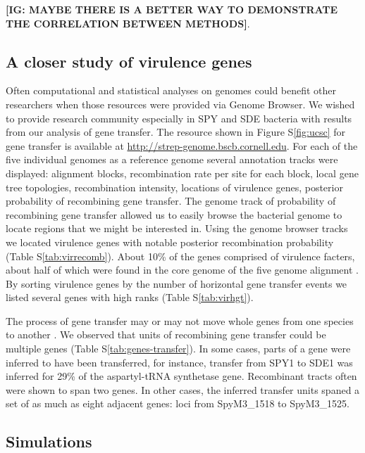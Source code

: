 \documentclass[10pt]{article}
\let\citep\cite
\begin{document}
{\bf [IG: MAYBE THERE IS A BETTER WAY TO DEMONSTRATE THE CORRELATION BETWEEN METHODS]}.

\subsection*{A closer study of virulence genes}

Often computational and statistical analyses on genomes could benefit other
researchers when those resources were provided via Genome Browser.  We wished to
provide research community especially in SPY and SDE bacteria with results from
our analysis of gene transfer.  The resource shown in Figure S\ref{fig:ucsc} for
gene transfer is available at \url{http://strep-genome.bscb.cornell.edu}.  For
each of the five individual genomes as a reference genome several annotation
tracks were displayed: alignment blocks, recombination rate per site for each
block, local gene tree topologies, recombination intensity, locations of
virulence genes, posterior probability of recombining gene transfer. The genome
track of probability of recombining gene transfer allowed us to easily browse
the bacterial genome to locate regions that we might be interested in.  Using
the genome browser tracks we located virulence genes with notable posterior
recombination probability (Table S\ref{tab:virrecomb}).  About 10\% of the genes
comprised of virulence facters, about half of which were found in the core
genome of the five genome alignment \citep{Suzuki2011}.  By sorting virulence
genes by the number of horizontal gene transfer events we listed several genes
with high ranks (Table S\ref{tab:virhgt}).

The process of gene transfer may or may not move whole genes from one species to
another \citep{Chan2009}. We observed that units of recombining gene
transfer could be multiple genes (Table S\ref{tab:genes-transfer}). In some
cases, parts of a gene were inferred to have been transferred, for instance,
transfer from SPY1 to SDE1 was inferred for 29\% of the aspartyl-tRNA synthetase
gene. Recombinant tracts often were shown to span two genes.  In other cases,
the inferred transfer units spaned a set of as much as eight adjacent genes:
loci from SpyM3\_1518 to SpyM3\_1525.

\subsection{Simulations}
\end{document}
